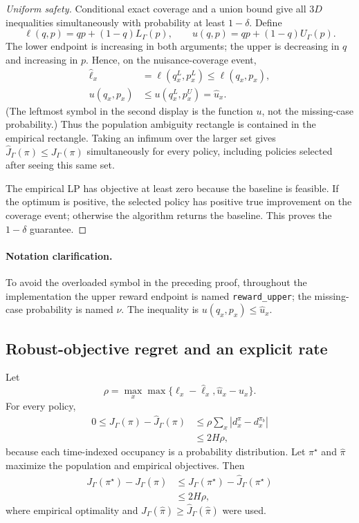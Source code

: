 \documentclass[letterpaper]{article}
\begin{document}
\begin{proof}[Uniform safety]
Conditional exact coverage and a union bound give all $3D$ inequalities simultaneously with probability at least $1-\delta$. Define
\[
\ell(q,p)=qp+(1-q)L_\Gamma(p),\qquad
u(q,p)=qp+(1-q)U_\Gamma(p).
\]
The lower endpoint is increasing in both arguments; the upper is decreasing in $q$ and increasing in $p$. Hence, on the nuisance-coverage event,
\begin{align*}
\widehat\ell_x&=\ell(q_x^L,p_x^L)\leq\ell(q_x,p_x),\\
u(q_x,p_x)&\leq u(q_x^L,p_x^U)=\widehat u_x.
\end{align*}
(The leftmost symbol in the second display is the function $u$, not the missing-case probability.) Thus the population ambiguity rectangle is contained in the empirical rectangle. Taking an infimum over the larger set gives
$\widehat J_\Gamma(\pi)\leq J_\Gamma(\pi)$ simultaneously for every policy, including policies selected after seeing this same set.

The empirical LP has objective at least zero because the baseline is feasible. If the optimum is positive, the selected policy has positive true improvement on the coverage event; otherwise the algorithm returns the baseline. This proves the $1-\delta$ guarantee.
\end{proof}

\paragraph{Notation clarification.}
To avoid the overloaded symbol in the preceding proof, throughout the implementation the upper reward endpoint is named \texttt{reward\_upper}; the missing-case probability is named $\nu$. The inequality is $u(q_x,p_x)\leq\widehat u_x$.

\subsection{Robust-objective regret and an explicit rate}
Let
\[
\rho=\max_x\max\{\ell_x-\widehat\ell_x,\widehat u_x-u_x\}.
\]
For every policy,
\begin{align*}
0\leq J_\Gamma(\pi)-\widehat J_\Gamma(\pi)
&\leq\rho\sum_x|d_x^\pi-d_x^{\pi_b}|\\
&\leq2H\rho,
\end{align*}
because each time-indexed occupancy is a probability distribution. Let $\pi^\star$ and $\widehat\pi$ maximize the population and empirical objectives. Then
\begin{align*}
J_\Gamma(\pi^\star)-J_\Gamma(\widehat\pi)
&\leq J_\Gamma(\pi^\star)-\widehat J_\Gamma(\pi^\star)\\
&\leq2H\rho,
\end{align*}
where empirical optimality and $J_\Gamma(\widehat\pi)\geq\widehat J_\Gamma(\widehat\pi)$ were used.
\end{document}
